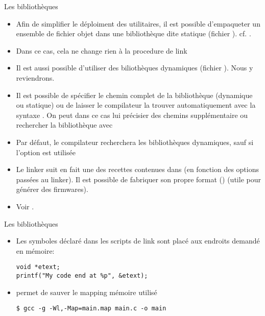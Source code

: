 \begin{frame}[fragile=singleslide]{Les bibliothèques}
  \begin{itemize}
  \item  Afin de  simplifier  le déploiment  des  utilitaires, il  est
    possible  d'empaqueter  un  ensemble  de fichier  objet  dans  une
    bibliothèque dite statique (fichier ). cf. .
  \item Dans ce cas, cela ne change rien à la procedure de link
  \item Il  est aussi possible d'utiliser  des biliothèques dynamiques
    (fichier ). Nous y reviendrons.
  \item  Il  est  possible  de  spécifier  le  chemin  complet  de  la
    bibliothèque (dynamique ou statique)  ou de laisser le compilateur
    la trouver automatiquement avec la syntaxe .  On peut
    dans ce cas lui précisier des chemins supplémentaire ou rechercher
    la bibliothèque avec 
  \item  Par  défaut,  le  compilateur recherchera  les  bibliothèques
    dynamiques, sauf si l'option  est utilisée
  \item  Le  linker suit  en  fait  une  des recettes  contenues  dans
      (en fonction  des  options passées  au
    linker).   Il   est  possible  de  fabriquer   son  propre  format
    () (utile pour générer des firmwares).
  \item Voir .
  \end{itemize} 
\end{frame}

\begin{frame}[fragile=singleslide]{Les bibliothèques}
  \begin{itemize} 
  \item  Les  symboles déclaré dans les scripts
    de link sont placé aux endroits demandé en mémoire:
    \begin{lstlisting}
void *etext;
printf("My code end at %p", &etext);
    \end{lstlisting} 
  \item {} permet de sauver le mapping mémoire utilisé
    \begin{lstlisting}
$ gcc -g -Wl,-Map=main.map main.c -o main
    \end{lstlisting} 
  \end{itemize}
\end{frame}

